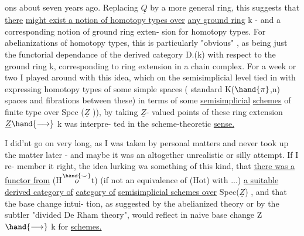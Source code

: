 
ons about seven years ago.  Replacing $\underline{Q}$ by a more general ring,  this
suggests that \uline{there}  \uline{might exist a notion of homotopy types over}
\uline{any ground ring}  k  -  and a corresponding notion of ground ring exten-%
sion for homotopy types.  For abelianizations of homotopy types,  this
is particularly "obvious" ,  as  being just the functorial dependance
of the derived category  D.(k)  with respect to the ground ring k,
corresponding to ring extension in a chain complex.  For a  week or
two I played around with this idea,  which on the semisimplicial level
tied in with expressing homotopy types of some simple spaces (
standard K($\hand{\pi}$,n) spaces and fibrations between these) in terms of some
 \uline{semisimplicial} \uline{schemes}  of finite type over Spec ($\underline{Z}$ )),  by taking $\underline{Z}$-%
valued points of these\over{,}{;}  ring extension  $\underline{Z} \hand{\longrightarrow}$ k  was interpre-%
ted in the scheme-theoretic \uline{sense.}

I did'nt go on very long,  as  I was
 taken by personal matters and never took up the matter later  -
and maybe it was an altogether unrealistic or silly attempt.  If I re-%
member it right,  the idea lurking wa  something of this
kind,  that \uline{there was a functor from} (H$\overset{\hand{\smile}}{o}$t)  (if not an equivalence of
(Hot) with ...)   \uline{a suitable derived category of}  \uline{category of}
\uline{semisimplicial schemes  over} Spec($\underline{Z}$) ,  and that the base change intui-%
tion,  as suggested by the abelianized theory or by the subtler "divided
 De Rham theory",  would reflect in naive base change  Z $\hand{\longrightarrow}$ k  for
\uline{schemes.}

